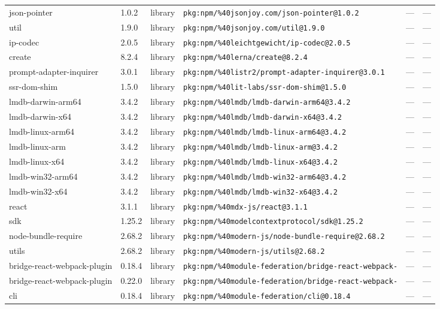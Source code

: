 \documentclass[11pt]{article}
\begin{document}
\begin{longtable}{|l|l|l|p{2.2cm}|l|p{4cm}|}
json-pointer & 1.0.2 & library & \texttt{pkg:npm/\%40jsonjoy.com/json-pointer@1.0.2} & — & — \\
util & 1.9.0 & library & \texttt{pkg:npm/\%40jsonjoy.com/util@1.9.0} & — & — \\
ip-codec & 2.0.5 & library & \texttt{pkg:npm/\%40leichtgewicht/ip-codec@2.0.5} & — & — \\
create & 8.2.4 & library & \texttt{pkg:npm/\%40lerna/create@8.2.4} & — & — \\
prompt-adapter-inquirer & 3.0.1 & library & \texttt{pkg:npm/\%40listr2/prompt-adapter-inquirer@3.0.1} & — & — \\
ssr-dom-shim & 1.5.0 & library & \texttt{pkg:npm/\%40lit-labs/ssr-dom-shim@1.5.0} & — & — \\
lmdb-darwin-arm64 & 3.4.2 & library & \texttt{pkg:npm/\%40lmdb/lmdb-darwin-arm64@3.4.2} & — & — \\
lmdb-darwin-x64 & 3.4.2 & library & \texttt{pkg:npm/\%40lmdb/lmdb-darwin-x64@3.4.2} & — & — \\
lmdb-linux-arm64 & 3.4.2 & library & \texttt{pkg:npm/\%40lmdb/lmdb-linux-arm64@3.4.2} & — & — \\
lmdb-linux-arm & 3.4.2 & library & \texttt{pkg:npm/\%40lmdb/lmdb-linux-arm@3.4.2} & — & — \\
lmdb-linux-x64 & 3.4.2 & library & \texttt{pkg:npm/\%40lmdb/lmdb-linux-x64@3.4.2} & — & — \\
lmdb-win32-arm64 & 3.4.2 & library & \texttt{pkg:npm/\%40lmdb/lmdb-win32-arm64@3.4.2} & — & — \\
lmdb-win32-x64 & 3.4.2 & library & \texttt{pkg:npm/\%40lmdb/lmdb-win32-x64@3.4.2} & — & — \\
react & 3.1.1 & library & \texttt{pkg:npm/\%40mdx-js/react@3.1.1} & — & — \\
sdk & 1.25.2 & library & \texttt{pkg:npm/\%40modelcontextprotocol/sdk@1.25.2} & — & — \\
node-bundle-require & 2.68.2 & library & \texttt{pkg:npm/\%40modern-js/node-bundle-require@2.68.2} & — & — \\
utils & 2.68.2 & library & \texttt{pkg:npm/\%40modern-js/utils@2.68.2} & — & — \\
bridge-react-webpack-plugin & 0.18.4 & library & \texttt{pkg:npm/\%40module-federation/bridge-react-webpack-} & — & — \\
bridge-react-webpack-plugin & 0.22.0 & library & \texttt{pkg:npm/\%40module-federation/bridge-react-webpack-} & — & — \\
cli & 0.18.4 & library & \texttt{pkg:npm/\%40module-federation/cli@0.18.4} & — & — \\

\end{longtable}
\end{document}
